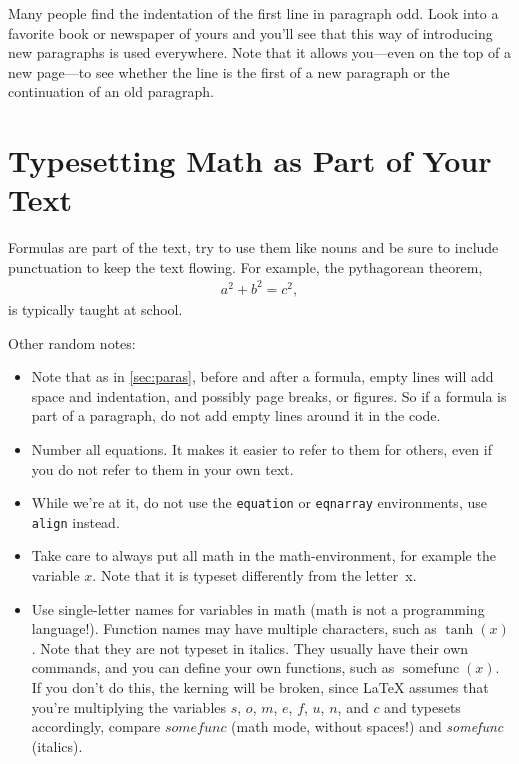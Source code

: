 \documentclass[8pt, %
a5paper, %
twoside, %
openright, %
abstract=off, %
DIV=11,      %
BCOR=8mm]{scrbook} %
\DeclareMathOperator*{\somefunc}{somefunc}
\begin{document}
    Many  people find  the  indentation  of the  first  line in  paragraph 
    odd.  Look into  a favorite book or newspaper of  yours and you'll see 
    that this way of introducing  new paragraphs is used everywhere.  Note 
    that it  allows you---even on the  top of a new  page---to see whether 
    the line is the first of a new paragraph or the continuation of an old 
    paragraph.                                                             

    \section{Typesetting Math as Part of Your Text}

    Formulas are part of the text, try  to use them like nouns and be sure 
    to include  punctuation to  keep the text  flowing.  For  example, the 
    pythagorean theorem,                                                   
    \begin{align}
        a^2 + b^2 = c^2,
    \end{align}
    is typically taught at school.

    Other random notes:

    \begin{itemize}
        \item
    Note that  as in \cref{sec:paras},  before and after a  formula, empty 
    lines will  add space  and indentation, and  possibly page  breaks, or 
    figures.  So  if a formula  is part of a  paragraph, do not  add empty 
    lines around it in the code.                                           

        \item
    Number all equations.  It makes it  easier to refer to them for others,
    even if you do not refer to them in your own text.

        \item
    While we're at  it, do not use the  \verb+equation+ or \verb+eqnarray+ 
    environments, use \verb+align+ instead.

        \item
    Take care to always put all  math in the math-environment, for example 
    the  variable $x$.   Note  that  it is  typeset  differently from  the 
    letter~x.

        \item
    Use  single-letter  names  for  variables   in  math  (math  is  not  a
    programming language!).   Function names  may have  multiple characters,
    such as $\tanh(x)$.  Note that they are not typeset in italics.  
    They  usually have  their own  commands, and  you can  define your  own
    functions, such as  $\somefunc(x)$.  If you don't do  this, the kerning
    will  be broken,  since \LaTeX{}  assumes that  you're multiplying  the
    variables  $s$, $o$,  $m$, $e$,  $f$, $u$,  $n$, and  $c$ and  typesets
    accordingly,  compare  $somefunc$  (math  mode,  without  spaces!)  and
    \emph{somefunc} (italics).

    \end{itemize}
\end{document}
